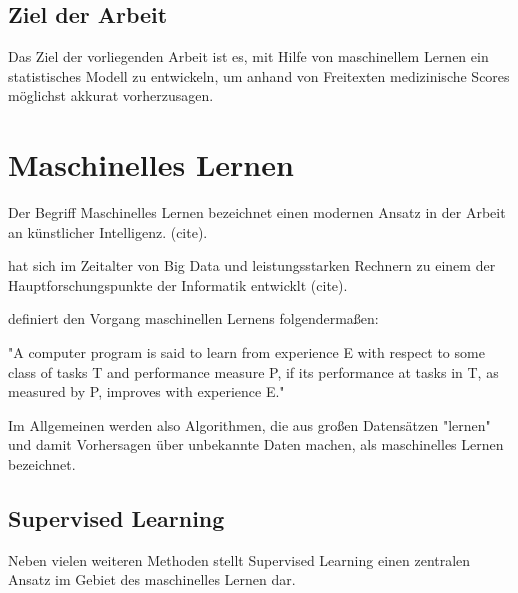 \subsection{Ziel der Arbeit}

Das Ziel der vorliegenden Arbeit ist es, mit Hilfe von maschinellem Lernen ein statistisches Modell zu entwickeln, um anhand von Freitexten medizinische Scores möglichst akkurat vorherzusagen.

\section{Maschinelles Lernen}

Der Begriff Maschinelles Lernen bezeichnet einen modernen Ansatz in der Arbeit an künstlicher Intelligenz. (cite).

hat sich im Zeitalter von Big Data und leistungsstarken Rechnern zu einem der Hauptforschungspunkte der Informatik entwicklt (cite). 

\citet{mitchellMachineLearning1997} definiert den Vorgang maschinellen Lernens folgendermaßen:

\begin{itquote}
    {\foreignlanguage{english}{"A computer program is said to learn from experience E with respect to some class of tasks T and performance measure P, if its performance at tasks in T, as measured by P, improves with experience E."}}
\end{itquote}


Im Allgemeinen werden also Algorithmen, die aus großen Datensätzen "lernen" und damit Vorhersagen über unbekannte Daten machen, als maschinelles Lernen bezeichnet.

\subsection{Supervised Learning}

Neben vielen weiteren Methoden stellt Supervised Learning einen zentralen Ansatz im Gebiet des maschinelles Lernen dar.


